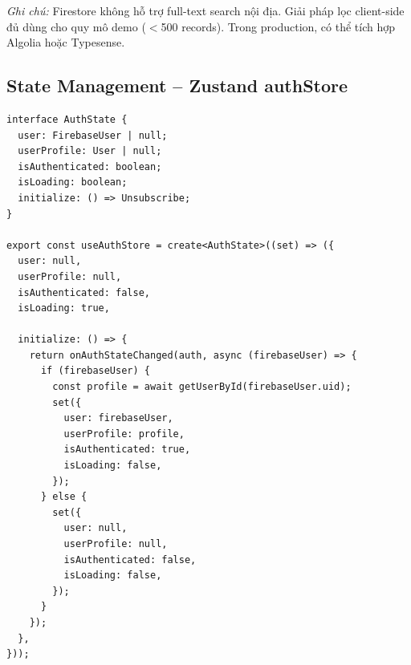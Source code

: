 \textit{Ghi chú:} Firestore không hỗ trợ full-text search nội địa. Giải pháp lọc
client-side đủ dùng cho quy mô demo ($<$500 records). Trong production, có thể tích hợp
Algolia hoặc Typesense.

\subsection{State Management -- Zustand authStore}

\begin{lstlisting}[caption={authStore.ts -- Global auth state with Zustand}]
interface AuthState {
  user: FirebaseUser | null;
  userProfile: User | null;
  isAuthenticated: boolean;
  isLoading: boolean;
  initialize: () => Unsubscribe;
}

export const useAuthStore = create<AuthState>((set) => ({
  user: null,
  userProfile: null,
  isAuthenticated: false,
  isLoading: true,

  initialize: () => {
    return onAuthStateChanged(auth, async (firebaseUser) => {
      if (firebaseUser) {
        const profile = await getUserById(firebaseUser.uid);
        set({
          user: firebaseUser,
          userProfile: profile,
          isAuthenticated: true,
          isLoading: false,
        });
      } else {
        set({
          user: null,
          userProfile: null,
          isAuthenticated: false,
          isLoading: false,
        });
      }
    });
  },
}));
\end{lstlisting}

